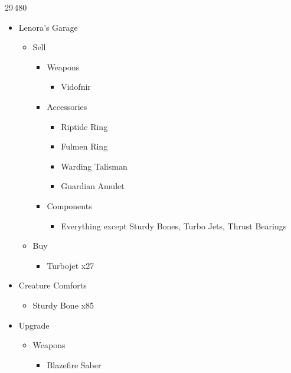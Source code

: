 \begin{multicols}{2}
\begin{shop}{29\,480}
\begin{itemize}
    \item Lenora's Garage
    \begin{itemize}
        \item Sell
        \begin{itemize}
            \item Weapons
            \begin{itemize}
                \item Vidofnir
            \end{itemize}
            \item Accessories
            \begin{itemize}
                \item Riptide Ring
                \item Fulmen Ring
                \item Warding Talisman
                \item Guardian Amulet
            \end{itemize}
            \item Components
            \begin{itemize}
                \item Everything except Sturdy Bones, Turbo Jets, Thrust Bearings
            \end{itemize}
        \end{itemize}
        \item Buy
        \begin{itemize}
            \item Turbojet x27
        \end{itemize}
    \end{itemize}
    \item Creature Comforts
    \begin{itemize}
        \item Sturdy Bone x85
    \end{itemize}
\end{itemize}
\end{shop}
\vfill
\begin{upgrade}
\begin{itemize}
    \item Upgrade
    \begin{itemize}
        \item Weapons
        \begin{itemize}
            \item Blazefire Saber

\end{itemize}
\end{itemize}
\end{itemize}
\end{upgrade}
\end{multicols}
